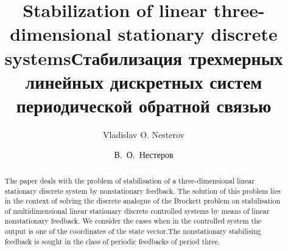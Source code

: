 \begin{englishtitle}
\title{Stabilization of linear three-dimensional stationary discrete systems}
\author{Vladislav O. Nesterov}

\maketitle

\begin{abstract}
The paper deals with the  problem of stabilisation of a three-dimensional linear stationary discrete system by nonstationary feedback. The solution of this problem lies in the context of solving the discrete analogue of the Brockett problem on stabilisation of multidimensional linear stationary discrete controlled systems by means of linear nonstationary feedback. We consider the cases when in the controlled system the output is one of the coordinates of the state vector.The nonstationary stabilising feedback is sought in the class of periodic feedbacks of period three.

\end{abstract}
\end{englishtitle}

\iffalse
\documentclass[12pt]{llncs}
\usepackage[T2A]{fontenc}
\usepackage[utf8]{inputenc}
\usepackage[english,russian]{babel}
\usepackage[russian]{nla}




\fi

\title{Стабилизация трехмерных линейных дискретных систем периодической обратной связью}
\author{В.~О.~Нестеров%
} 


